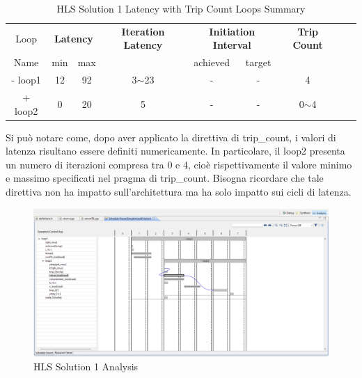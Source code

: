 \begin{table}[H]
	\centering
	\begin{tabular}{|c|c|c|c|c|c|c|c|c|}
		\hline
		\multicolumn{1}{|c|}{Loop} & \multicolumn{2}{|c|}{\textbf{Latency}} & \multicolumn{1}{c|}{\textbf{Iteration Latency}} & \multicolumn{2}{c|}{\textbf{Initiation Interval}} & \multicolumn{1}{c|}{\textbf{Trip Count}}  \\
		Name & min & max & & achieved & target &  \\
		\hline
		- loop1 & 12 & 92 & 3$\sim$23 & - & - & 4 \\
		+ loop2 & 0 & 20 & 5 & - & - & 0$\sim$4 \\
		\hline
	\end{tabular}
	\caption{HLS Solution 1 Latency with Trip Count Loops Summary }
	\label{tab:hls-solution-1-loop-summary}
\end{table}

Si può notare come, dopo aver applicato la direttiva di trip\_count, i valori di latenza risultano essere definiti numericamente. In particolare, il loop2 presenta un numero di iterazioni compresa tra 0 e 4, cioè rispettivamente il valore minimo e massimo specificati nel pragma di trip\_count. Bisogna ricordare che tale direttiva non ha impatto sull'architettura ma ha solo impatto sui cicli di latenza.

\begin{figure}[H]
	\centering
	\includegraphics[width=1\textwidth]{solutions/s1/s1analysis.png}
	\caption{HLS Solution 1 Analysis}
\end{figure}

